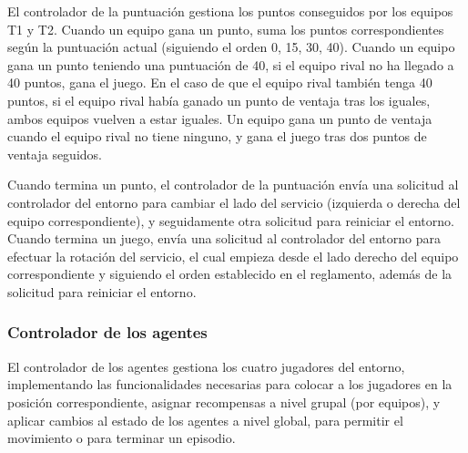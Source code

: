 El controlador de la puntuación gestiona los puntos conseguidos por los equipos T1 y T2. Cuando un equipo gana un punto, suma los puntos correspondientes según la puntuación actual (siguiendo el orden 0, 15, 30, 40). Cuando un equipo gana un punto teniendo una puntuación de 40, si el equipo rival no ha llegado a 40 puntos, gana el juego. En el caso de que el equipo rival también tenga 40 puntos, si el equipo rival había ganado un punto de ventaja tras los iguales, ambos equipos vuelven a estar iguales. Un equipo gana un punto de ventaja cuando el equipo rival no tiene ninguno, y gana el juego tras dos puntos de ventaja seguidos.

Cuando termina un punto, el controlador de la puntuación envía una solicitud al controlador del entorno para cambiar el lado del servicio (izquierda o derecha del equipo correspondiente), y seguidamente otra solicitud para reiniciar el entorno. Cuando termina un juego, envía una solicitud al controlador del entorno para efectuar la rotación del servicio, el cual empieza desde el lado derecho del equipo correspondiente y siguiendo el orden establecido en el reglamento, además de la solicitud para reiniciar el entorno.

\subsubsection{Controlador de los agentes}

El controlador de los agentes gestiona los cuatro jugadores del entorno, implementando las funcionalidades necesarias para colocar a los jugadores en la posición correspondiente, asignar recompensas a nivel grupal (por equipos), y aplicar cambios al estado de los agentes a nivel global, para permitir el movimiento o para terminar un episodio.

